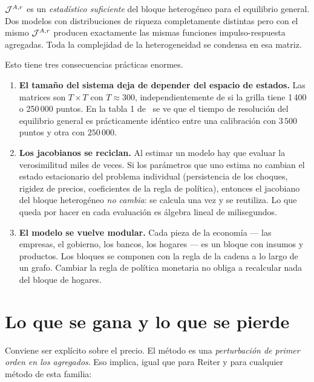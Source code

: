 \begin{idea}
$\mathcal{J}^{A,r}$ es un \emph{estadístico suficiente} del bloque heterogéneo para el
equilibrio general. Dos modelos con distribuciones de riqueza completamente
distintas pero con el mismo $\mathcal{J}^{A,r}$ producen exactamente las mismas funciones
impulso-respuesta agregadas. Toda la complejidad de la heterogeneidad se
condensa en esa matriz.
\end{idea}

Esto tiene tres consecuencias prácticas enormes.

\begin{enumerate}[leftmargin=1.4em]
\item \textbf{El tamaño del sistema deja de depender del espacio de estados.}
Las matrices son $T\times T$ con $T\approx 300$, independientemente de si la
grilla tiene 1\,400 o 250\,000 puntos. En la tabla 1 de \abrs\ se ve que el
tiempo de resolución del equilibrio general es prácticamente idéntico entre una
calibración con $3\,500$ puntos y otra con $250\,000$.

\item \textbf{Los jacobianos se reciclan.} Al estimar un modelo hay que evaluar
la verosimilitud miles de veces. Si los parámetros que uno estima no cambian el
estado estacionario del problema individual (persistencia de los choques,
rigidez de precios, coeficientes de la regla de política), entonces el jacobiano
del bloque heterogéneo \emph{no cambia}: se calcula una vez y se reutiliza. Lo
que queda por hacer en cada evaluación es álgebra lineal de milisegundos.

\item \textbf{El modelo se vuelve modular.} Cada pieza de la economía --- las
empresas, el gobierno, los bancos, los hogares --- es un bloque con insumos y
productos. Los bloques se componen con la regla de la cadena a lo largo de un
grafo. Cambiar la regla de política monetaria no obliga a recalcular nada del
bloque de hogares.
\end{enumerate}

\section{Lo que se gana y lo que se pierde}
\label{sec:limites-perturbacion}

Conviene ser explícito sobre el precio. El método es una \emph{perturbación de
primer orden en los agregados}. Eso implica, igual que para Reiter y para
cualquier método de esta familia:

